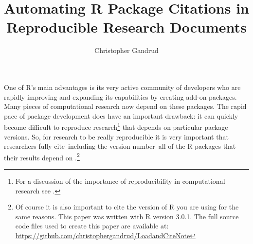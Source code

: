 \title{Automating R Package Citations in Reproducible Research Documents}
\author{Christopher Gandrud}

\maketitle





One of R's main advantages is its very active community of developers who are rapidly improving and expanding its capabilities by creating add-on packages. Many pieces of computational research now depend on these packages. The rapid pace of package development does have an important drawback: it can quickly become difficult to reproduce research\footnote{For a discussion of the importance of reproducibility in computational research see \cite{Peng2011}.} that depends on particular package versions. So, for research to be really reproducible it is very important that researchers fully cite--including the version number--all of the R packages that their results depend on \citep[see][for more details]{Jackson2012}.\footnote{Of course it is also important to cite the version of R you are using for the same reasons. This paper was written with R version 3.0.1. The full source code files used to create this paper are available at: \url{https://github.com/christophergandrud/LoadandCiteNote}}

